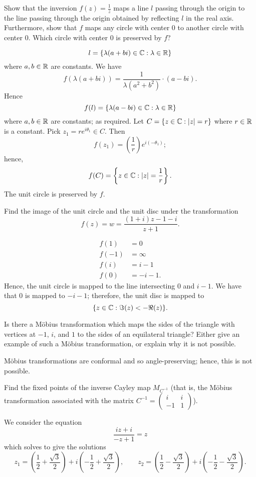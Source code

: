
\setcounter{question}{1}
\question Show that the inversion $f(z) = \frac1z$ maps a line $l$ passing through the origin to the line passing through the origin obtained by reflecting $l$ in the real axis. 
Furthermore, show that $f$ maps any circle with center $0$ to another circle with center $0$. 
Which circle with center $0$ is preserved by $f$?
\begin{solution}
    \[ l = \{\lambda(a + bi) \in \mathbb{C}: \lambda \in \mathbb{R}\} \]
    where $a, b \in \mathbb{R}$ are constants. We have
    \[ f(\lambda(a + bi)) = \frac1{\lambda(a^2 + b^2)} \cdot (a - bi). \]
    Hence
    \[ f(l) = \{ \lambda (a - bi) \in \mathbb{C}: \lambda \in \mathbb{R}\} \]
    where $a, b \in \mathbb{R}$ are constants; as required.
    Let $C = \{z \in \mathbb{C}: \left\lvert z\right\rvert = r\}$ where $r \in \mathbb{R}$ is a constant.
    Pick $z_1 = re^{i\theta_1} \in C$. 
    Then
    \[ f(z_1) = \left(\frac1r\right)e^{i(-\theta_1)}; \]
    hence, 
    \[ f(C) = \left\{z \in \mathbb{C}: \left\lvert z\right\rvert = \frac1r\right\}. \]
    The unit circle is preserved by $f$.
\end{solution}

\setcounter{question}{4}
\question Find the image of the unit circle and the unit disc under the transformation
\[ f(z) = w = \frac{(1 + i) z -1 - i}{z + 1}. \]
\begin{solution}
    \begin{align*}
        f(1) &= 0 \\
        f(-1) &= \infty \\
        f(i) &= i - 1 \\
        f(0) &= -i - 1.
    \end{align*}
    Hence, the unit circle is mapped to the line intersecting $0$ and $i - 1$.
    We have that $0$ is mapped to $-i - 1$; therefore, the unit disc is mapped to
    \[ \{ z \in \mathbb{C}: \Im(z) < - \Re(z) \}. \]
\end{solution}

\setcounter{question}{5}
\question Is there a M\"obius transformation which maps the sides of the triangle with vertices at $-1$, $i$, and $1$ to the sides of an equilateral triangle? 
Either give an example of such a M\"obius transformation, or explain why it is not possible.
\begin{solution}
    M\"obius transformations are conformal and so angle-preserving; hence, this is not possible.
\end{solution}

\setcounter{question}{7}
\question Find the fixed points of the inverse Cayley map $M_{C^{-1}}$ (that is, the M\"obius transformation associated with the matrix $C^{-1} = \begin{pmatrix} i & i \\ -1 & 1 \end{pmatrix}$).
\begin{solution}
    We consider the equation
    \[ \frac{iz + i}{-z + 1} = z \]
    which solves to give the solutions
    \[ z_1 = \left(\frac12 + \frac{\sqrt 3}2\right) + i\left(-\frac12 + \frac{\sqrt 3}2\right), \qquad z_2 = \left(\frac12 - \frac{\sqrt 3}2\right) + i\left(-\frac12 - \frac{\sqrt 3}2\right). \]
\end{solution}

